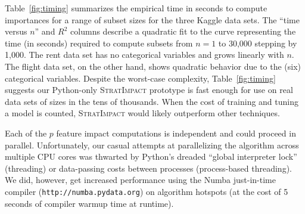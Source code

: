 \documentclass[smallextended]{svjour3}       %
\newcommand{\tblref}[1]{Table~\ref{#1}}
\newcommand{\simp}{\fontfamily{cmr}\textsc{\small StratImpact}}
\begin{document}
\tblref{fig:timing} summarizes the empirical time in seconds to compute importances for a range of subset sizes for the three Kaggle data sets. The ``time versus $n$'' and $R^2$ columns describe a quadratic fit to the curve representing the time (in seconds) required to compute subsets from $n=1$ to 30,000 stepping by 1,000. The rent data set has no categorical variables and grows linearly with $n$. The flight data set, on the other hand, shows quadratic behavior due to the (six) categorical variables. Despite the worst-case complexity, \tblref{fig:timing} suggests our Python-only \simp{} prototype is fast enough for use on real data sets of sizes in the tens of thousands. When the cost of training and tuning a model is counted, \simp{} would likely outperform other techniques.

Each of the $p$ feature impact computations is independent and could proceed in parallel. Unfortunately, our casual attempts at parallelizing the algorithm across multiple CPU cores was thwarted by Python's dreaded ``global interpreter lock'' (threading) or data-passing costs between processes (process-based threading).  We did, however, get increased performance using the Numba just-in-time compiler ({\tt\small http://numba.pydata.org}) on algorithm hotspots (at the cost of 5 seconds of compiler warmup time at runtime).
\end{document}
